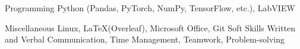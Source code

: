 

\begin{cvskills}

  \cvskill
    {Programming} %
    {Python (Pandas, PyTorch, NumPy, TensorFlow, etc.), LabVIEW} %

  \cvskill
    {Miscellaneous} %
    {Linux, \LaTeX (Overleaf), Microsoft Office, Git} %
  \cvskill
    {Soft Skills} %
    {Written and Verbal Communication, Time Management, Teamwork, Problem-solving} %

\end{cvskills}
